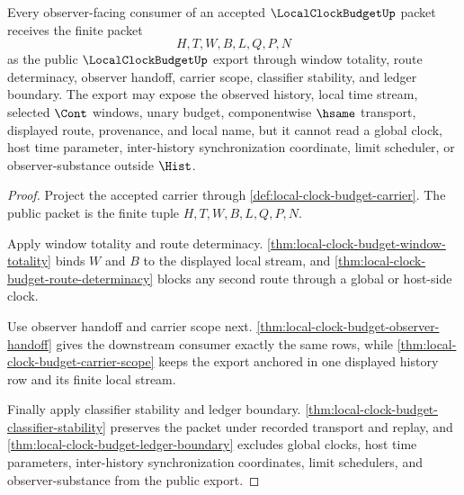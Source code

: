 \begin{theorem}
\label{thm:local-clock-budget-public-export}
Every observer-facing consumer of an accepted $\LocalClockBudgetUp$ packet receives the finite packet
$$
H,T,W,B,L,Q,P,N
$$
as the public $\LocalClockBudgetUp$ export through window totality, route determinacy, observer handoff, carrier scope, classifier stability, and ledger boundary. The export may expose the observed history, local time stream, selected $\Cont$ windows, unary budget, componentwise $\hsame$ transport, displayed route, provenance, and local name, but it cannot read a global clock, host time parameter, inter-history synchronization coordinate, limit scheduler, or observer-substance outside $\Hist$.
\end{theorem}
\begin{proof}
Project the accepted carrier through \autoref{def:local-clock-budget-carrier}. The public packet is the finite tuple $H,T,W,B,L,Q,P,N$.

Apply window totality and route determinacy. \autoref{thm:local-clock-budget-window-totality} binds $W$ and $B$ to the displayed local stream, and \autoref{thm:local-clock-budget-route-determinacy} blocks any second route through a global or host-side clock.

Use observer handoff and carrier scope next. \autoref{thm:local-clock-budget-observer-handoff} gives the downstream consumer exactly the same rows, while \autoref{thm:local-clock-budget-carrier-scope} keeps the export anchored in one displayed history row and its finite local stream.

Finally apply classifier stability and ledger boundary. \autoref{thm:local-clock-budget-classifier-stability} preserves the packet under recorded transport and replay, and \autoref{thm:local-clock-budget-ledger-boundary} excludes global clocks, host time parameters, inter-history synchronization coordinates, limit schedulers, and observer-substance from the public export.
\end{proof}

